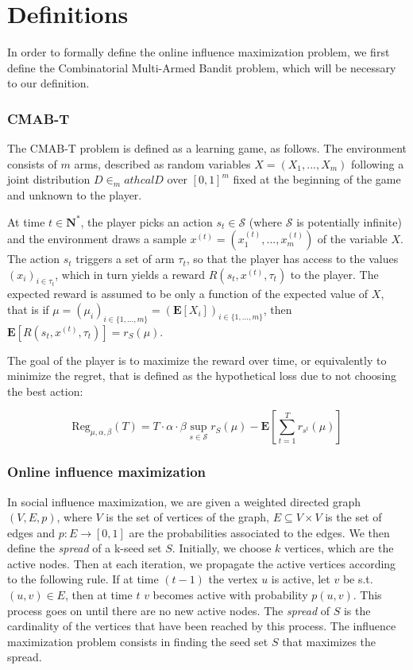 \documentclass[a4paper,12pt]{article}
\begin{document}
\section{Definitions}
\label{scn:def}

In order to formally define the online influence maximization problem, we first define the Combinatorial Multi-Armed Bandit problem, which will be necessary to our definition.

\subsubsection{CMAB-T}

The CMAB-T problem is defined as a learning game, as follows. The environment consists of $m$ arms, described as random variables $X = (X_1, ..., X_m)$ following a joint distribution $D\in_mathcal{D}$ over $[0, 1]^m$ fixed at the beginning of the game and unknown to the player.

At time $t\in\mathbf{N}^*$, the player picks an action $s_t\in\mathcal{S}$ (where $\mathcal{S}$ is potentially infinite) and the environment draws a sample $x^{(t)} = (x^{(t)}_1, ..., x^{(t)}_m)$ of the variable $X$. The action $s_t$ triggers a set of arm $\tau_t$, so that the player has access to the values $(x_i)_{i\in\tau_t}$, which in turn yields a reward $R(s_t, x^{(t)}, \tau_t)$ to the player. The expected reward is assumed to be only a function of the expected value of $X$, that is if $\mu = (\mu_i)_{i\in\{1, ..., m\}} = (\mathbf{E}[X_i])_{i\in\{1, ..., m\}}$, then $\mathbf{E}[R(s_t, x^{(t)}, \tau_t)] = r_S(\mu)$.

The goal of the player is to maximize the reward over time, or equivalently to minimize the regret, that is defined as the hypothetical loss due to not choosing the best action: 

\begin{equation}
 \label{eqn:regret}
\text{Reg}_{\mu, \alpha, \beta}(T) = T\cdot\alpha\cdot\beta\sup_{s\in\mathcal{S}}r_S(\mu) - \mathbf{E}\left[\sum_{t = 1}^{T}r_{s^{t}}(\mu)\right]
\end{equation}

\subsubsection{Online influence maximization}

In social influence maximization, we are given a weighted directed graph $(V, E, p)$, where $V$ is the set of vertices of the graph, $E\subseteq V\times V$ is the set of edges and $p:E\to [0, 1]$ are the probabilities associated to the edges. We then define the \emph{spread} of a k-seed set $S$. Initially, we choose $k$ vertices, which are the active nodes. Then at each iteration, we propagate the active vertices according to the following rule. If at time $(t-1)$ the vertex $u$ is active, let $v$ be s.t. $(u, v)\in E$, then at time $t$ $v$ becomes active with probability $p(u, v)$. This process goes on until there are no new active nodes. The \emph{spread} of $S$ is the cardinality of the vertices that have been reached by this process. The influence maximization problem consists in finding the seed set $S$ that maximizes the spread.
\end{document}
